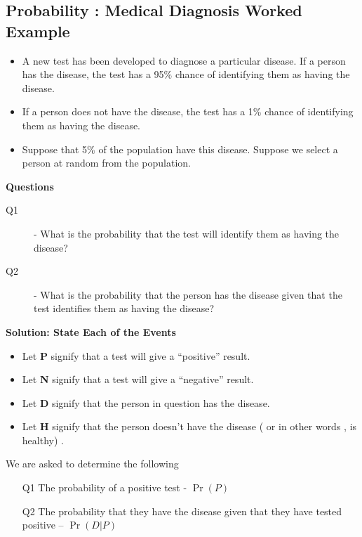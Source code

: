 
	
	\subsection*{Probability : Medical Diagnosis Worked Example}
	
	\begin{itemize}
		\item A new test has been developed to diagnose a particular disease. If a person has the disease, the test has a 95\% chance of identifying them as having the disease. 
		
		\item If a person does not have the disease, the test has a 1\% chance of identifying them as having the disease. 
		\item Suppose that 5\% of the population have this disease. Suppose we select a person at random from the population.
	\end{itemize}
	
	
	
	\noindent \textbf{Questions}
	\begin{description}
		\item[Q1] - What is the probability that the test will identify them as having the disease?
		
		\item[Q2] - What is the probability that the person has the disease given that the test identifies them as having the disease?
	\end{description}
	
	
	\noindent \textbf{Solution: State Each of the Events}
	
	\begin{itemize}
		\item Let \textbf{P} signify that a test will give a “positive” result.
		\item Let \textbf{N} signify that a test will give a “negative” result.	
		\item Let \textbf{D} signify that the person in question has the disease.
		\item Let \textbf{H} signify that the person doesn’t have the disease ( or in other words , is healthy) .
	\end{itemize}
	\smallskip
	
	\noindent We are asked to determine the following 
	
	\begin{itemize}
		\item[Q1] The probability of a positive test - $\Pr(P)$
		\item[Q2] The probability that they have the disease given that they have tested positive – $\Pr(D|P)$
	\end{itemize}
	
